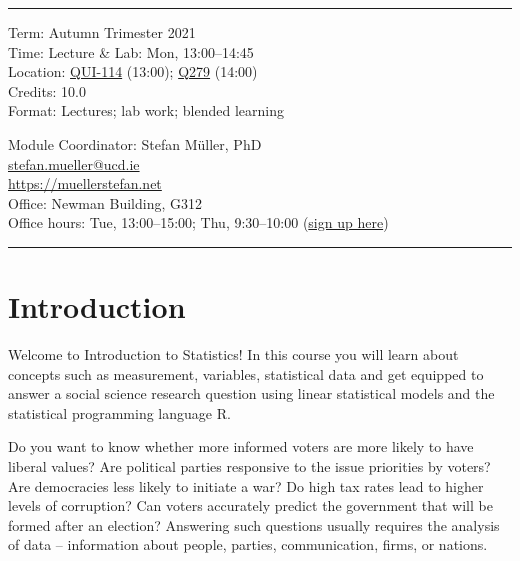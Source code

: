 \documentclass[abstract=on,parskip=full,headings=standardclasses,fontsize=11pt,paper=a4]{scrartcl}
\begin{document}
\vspace{1.5cm}



\hrule
\medskip
\begin{minipage}[t]{0.5\textwidth}
Term: Autumn Trimester 2021 \\
Time: Lecture \& Lab: Mon, 13:00--14:45 \\
Location:  \href{https://goo.gl/maps/zcPHQhj7GTumyHG67}{QUI-114} (13:00); \href{https://goo.gl/maps/zcPHQhj7GTumyHG67}{Q279}  (14:00)\\Credits: 10.0 \\
Format: Lectures; lab work; blended learning
\end{minipage}
\begin{minipage}[t]{0.49\textwidth}
\begin{flushright}
Module Coordinator: Stefan Müller, PhD  \\
 \href{mailto:stefan.mueller@ucd.ie}{\textsf{stefan.mueller@ucd.ie}} \\
 \url{https://muellerstefan.net} \\
Office:  Newman Building, G312 \\
Office hours: Tue, 13:00--15:00; Thu, 9:30--10:00 (\href{https://calendly.com/mueller-ucd/office-hours}{sign up here})
\end{flushright}
\end{minipage}
\medskip
\hrule 

\section*{Introduction}


Welcome to Introduction to Statistics! In this course you will learn about concepts such as measurement, variables, statistical data and get equipped to answer a social science research question using linear statistical models and the statistical programming language \textsf{R}.

Do you want to know whether more informed voters are more likely to have liberal values? Are political parties responsive to the issue priorities by voters? Are  democracies less likely to initiate a war? Do high tax rates lead to higher levels of corruption? Can voters accurately predict the government that will be formed after an election? Answering such questions usually requires the analysis of data  
-- information about people, parties, communication, firms, or nations.
\end{document}
